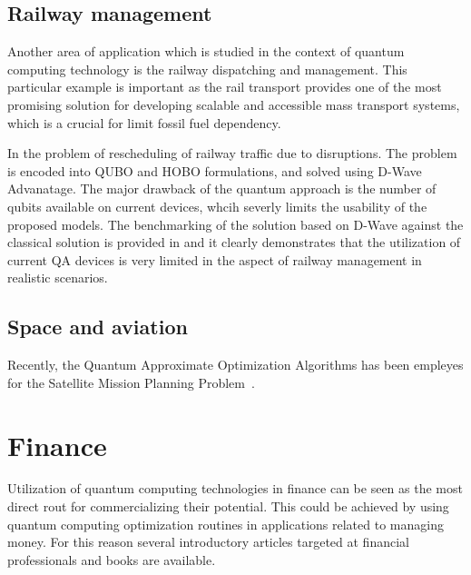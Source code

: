 \documentclass[a4paper,11pt]{article}
\begin{document}
\subsection{Railway management}

Another area of application which is studied in the context of quantum computing technology is the railway dispatching and management. This particular example is important as the rail transport provides one of the most promising solution for developing scalable and accessible mass transport systems, which is a crucial for limit fossil fuel dependency.


In \cite{domino2022quadratic} the problem of rescheduling of railway traffic due to disruptions. The problem is encoded into QUBO and HOBO formulations, and solved using D-Wave Advanatage. The major drawback of the quantum approach is the number of qubits available on current devices, whcih severly limits the usability of the proposed models. The benchmarking of the solution based on D-Wave against the classical solution is provided in \cite{domino2023quantum} and it clearly demonstrates that the utilization of current QA devices is very limited in the aspect of railway management in realistic scenarios. 


\subsection{Space and aviation}

Recently, the Quantum Approximate Optimization Algorithms has been empleyes for the Satellite Mission Planning Problem~\cite{quetschlich2023satellite}.

\section{Finance}


Utilization of quantum computing technologies in finance can be seen as the most direct rout for commercializing their potential. This could be achieved by using quantum computing optimization routines in applications related to managing money. For this reason several introductory articles targeted at financial professionals and books are available.
\end{document}
